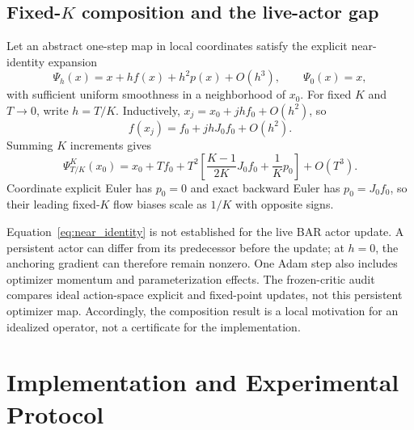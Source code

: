 \documentclass[letterpaper]{article}
\begin{document}
\subsection{Fixed-$K$ composition and the live-actor gap}
Let an abstract one-step map in local coordinates satisfy the explicit near-identity expansion
\begin{equation}
\Psi_h(x)=x+hf(x)+h^2p(x)+O(h^3),\qquad \Psi_0(x)=x,
\label{eq:near_identity}
\end{equation}
with sufficient uniform smoothness in a neighborhood of $x_0$. For fixed $K$ and $T\to0$, write $h=T/K$. Inductively, $x_j=x_0+jhf_0+O(h^2)$, so
\begin{equation}
f(x_j)=f_0+jhJ_0f_0+O(h^2).
\end{equation}
Summing $K$ increments gives
\begin{equation}
\Psi_{T/K}^{K}(x_0)=x_0+Tf_0+T^2\left[\frac{K-1}{2K}J_0f_0+\frac1Kp_0\right]+O(T^3).
\end{equation}
Coordinate explicit Euler has $p_0=0$ and exact backward Euler has $p_0=J_0f_0$, so their leading fixed-$K$ flow biases scale as $1/K$ with opposite signs.

Equation~\eqref{eq:near_identity} is not established for the live BAR actor update. A persistent actor can differ from its predecessor before the update; at $h=0$, the anchoring gradient can therefore remain nonzero. One Adam step also includes optimizer momentum and parameterization effects. The frozen-critic audit compares ideal action-space explicit and fixed-point updates, not this persistent optimizer map. Accordingly, the composition result is a local motivation for an idealized operator, not a certificate for the implementation.

\section{Implementation and Experimental Protocol}
\label{app:implementation}
\end{document}

